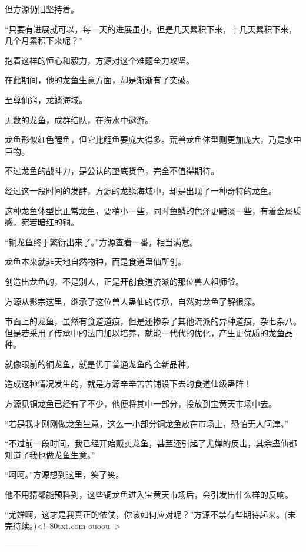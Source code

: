 \begin{this_body}
但方源仍旧坚持着。

“只要有进展就可以，每一天的进展虽小，但是几天累积下来，十几天累积下来，几个月累积下来呢？”

抱着这样的恒心和毅力，方源对这个难题全力攻坚。

在此期间，他的龙鱼生意方面，却是渐渐有了突破。

至尊仙窍，龙鳞海域。

无数的龙鱼，成群结队，在海水中遨游。

龙鱼形似红色鲤鱼，但它比鲤鱼要庞大得多。荒兽龙鱼体型则更加庞大，乃是水中巨物。

不过龙鱼的战斗力，是公认的垫底货色，完全不值得期待。

经过这一段时间的发酵，方源的龙鳞海域中，却是出现了一种奇特的龙鱼。

这种龙鱼体型比正常龙鱼，要稍小一些，同时鱼鳞的色泽更黯淡一些，有着金属质感，宛若暗红的铜。

“铜龙鱼终于繁衍出来了。”方源查看一番，相当满意。

龙鱼本来就非天地自然物种，而是食道蛊仙所创。

创造出龙鱼的，不是别人，正是开创食道流派的那位兽人祖师爷。

方源从影宗这里，继承了这位兽人蛊仙的传承，自然对龙鱼了解很深。

市面上的龙鱼，虽然有食道道痕，但是还掺杂了其他流派的异种道痕，杂七杂八。但是若采用了传承中的法门加以培养，就能一代代的优化，产生更优质的龙鱼品种。

就像眼前的铜龙鱼，就是优于普通龙鱼的全新品种。

造成这种情况发生的，就是方源辛辛苦苦铺设下去的食道仙级蛊阵！

方源见铜龙鱼已经有了不少，他便将其中一部分，投放到宝黄天市场中去。

“若是我才刚刚做龙鱼生意，这么一小部分铜龙鱼放在市场上，恐怕无人问津。”

“不过前一段时间，我已经开始贩卖龙鱼，甚至还引起了尤婵的反击，其余蛊仙都知道了我也做龙鱼生意。”

“呵呵。”方源想到这里，笑了笑。

他不用猜都能预料到，这些铜龙鱼进入宝黄天市场后，会引发出什么样的反响。

“尤婵啊，这才是我真正的依仗，你该如何应对呢？”方源不禁有些期待起来。(未完待续。)<!--80txt.com-ouoou-->

------------

\end{this_body}

